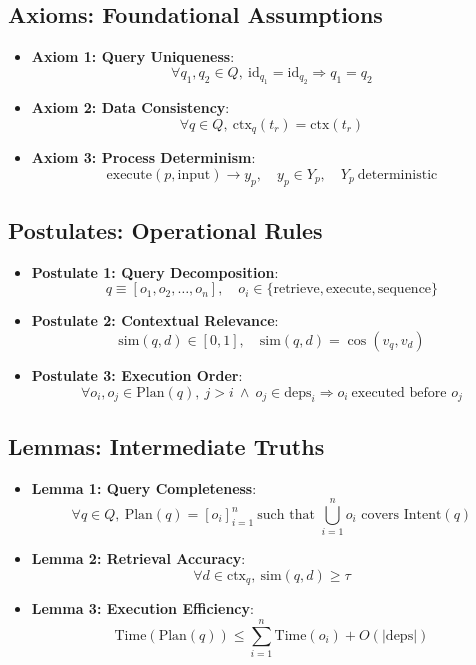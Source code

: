 \documentclass[11pt]{article}
\begin{document}
\subsection{Axioms: Foundational Assumptions}
\label{subsec:axioms}

\begin{itemize}
    \item \textbf{Axiom 1: Query Uniqueness}: 
    \[
    \forall q_1, q_2 \in Q,\ \text{id}_{q_1} = \text{id}_{q_2} \Rightarrow q_1 = q_2
    \]

    \item \textbf{Axiom 2: Data Consistency}:
    \[
    \forall q \in Q,\ \text{ctx}_q(t_r) = \text{ctx}(t_r)
    \]

    \item \textbf{Axiom 3: Process Determinism}:
    \[
    \text{execute}(p, \text{input}) \rightarrow y_p,\quad y_p \in Y_p,\quad Y_p\ \text{deterministic}
    \]
\end{itemize}

\subsection{Postulates: Operational Rules}
\label{subsec:postulates}

\begin{itemize}
    \item \textbf{Postulate 1: Query Decomposition}:
    \[
    q \equiv [o_1, o_2, \ldots, o_n],\quad o_i \in \{ \text{retrieve}, \text{execute}, \text{sequence} \}
    \]

    \item \textbf{Postulate 2: Contextual Relevance}:
    \[
    \text{sim}(q, d) \in [0, 1],\quad \text{sim}(q, d) = \cos(v_q, v_d)
    \]

    \item \textbf{Postulate 3: Execution Order}:
    \[
    \forall o_i, o_j \in \text{Plan}(q),\ j > i\ \wedge\ o_j \in \text{deps}_i \Rightarrow o_i\ \text{executed before } o_j
    \]
\end{itemize}

\subsection{Lemmas: Intermediate Truths}
\label{subsec:lemmas}

\begin{itemize}
    \item \textbf{Lemma 1: Query Completeness}:
    \[
    \forall q \in Q,\ \text{Plan}(q) = [o_i]_{i=1}^n\ \text{such that } \bigcup_{i=1}^n o_i \text{ covers } \text{Intent}(q)
    \]

    \item \textbf{Lemma 2: Retrieval Accuracy}:
    \[
    \forall d \in \text{ctx}_q,\ \text{sim}(q, d) \geq \tau
    \]

    \item \textbf{Lemma 3: Execution Efficiency}:
    \[
    \text{Time}(\text{Plan}(q)) \leq \sum_{i=1}^n \text{Time}(o_i) + O(|\text{deps}|)
    \]
\end{itemize}
\end{document}

